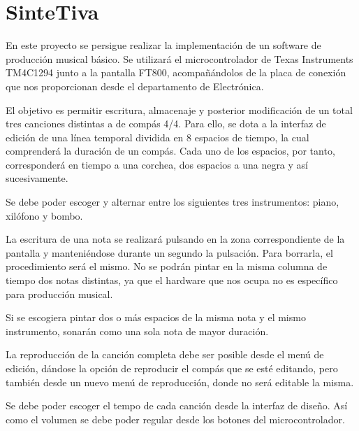 \documentclass[12pt,a4paper]{article}
\begin{document}
\begin{titlepage} 


\end{titlepage}

\tableofcontents
\newpage

\lstset{language=C++} 
\section{SinteTiva}
En este proyecto se persigue realizar la implementación de un software de producción musical básico. Se utilizará el microcontrolador de Texas Instruments TM4C1294 junto a la pantalla FT800, acompañándolos de la placa de conexión que nos proporcionan desde el departamento de Electrónica.


El objetivo es permitir escritura, almacenaje y posterior modificación de un total tres canciones distintas a de compás 4/4. Para ello, se dota a la interfaz de edición de una línea temporal dividida en 8 espacios de tiempo, la cual comprenderá la duración de un compás. Cada uno de los espacios, por tanto, corresponderá en tiempo a una corchea, dos espacios a una negra y así sucesivamente.


Se debe poder escoger y alternar entre los siguientes tres instrumentos: piano, xilófono y bombo.

La escritura de una nota se realizará pulsando en la zona correspondiente de la pantalla y manteniéndose durante un segundo la pulsación. Para borrarla, el procedimiento será el mismo. No se podrán pintar en la misma columna de tiempo dos notas distintas, ya que el hardware que nos ocupa no es específico para producción musical. 

Si se escogiera pintar dos o más espacios de la misma nota y el mismo instrumento, sonarán como una sola nota de mayor duración.


La reproducción de la canción completa debe ser posible desde el menú de edición, dándose la opción de reproducir el compás que se esté editando, pero también desde un nuevo menú de reproducción, donde no será editable la misma.

Se debe poder escoger el tempo de cada canción desde la interfaz de diseño. Así como el volumen se debe poder regular desde los botones del microcontrolador.
\end{document}
